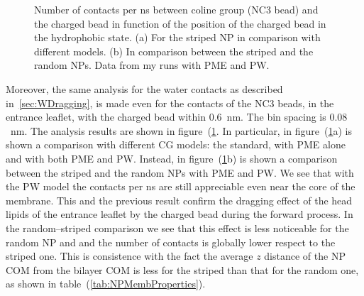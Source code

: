 \begin{figure}
	\center
	\caption{Number of contacts per ns between coline group (NC3 bead) and the charged bead in function of the position of the charged bead in the hydrophobic state. (a) For the striped \acs{NP} in comparison with different models. (b) In comparison between the striped and the random \acs{NP}s. Data from my runs with \acs{PME} and \acs{PW}.}
	\label{fig:NC3Contact}
\end{figure}

Moreover, the same analysis for the water contacts as described in~\ref{sec:WDragging}, is made even for the contacts of the NC$3$ beads, in the entrance leaflet, with the charged bead within $0.6$~nm. The bin spacing is $0.08$~nm. The analysis results are shown in figure~(\ref{fig:NC3Contact}. In particular, in figure~(\ref{fig:NC3Contact}a) is shown a comparison with different \ac{CG} \martini models: the standard, with \ac{PME} alone and with both \ac{PME} and \ac{PW}. Instead, in figure~(\ref{fig:NC3Contact}b) is shown a comparison between the striped and the random \acp{NP} with \ac{PME} and \ac{PW}. We see that with the \ac{PW} model the contacts per ns are still appreciable even near the core of the membrane. This and the previous result confirm the dragging effect of the head lipids of the entrance leaflet by the charged bead during the forward process. In the random--striped comparison we see that this effect is less noticeable for the random \ac{NP} and and the number of contacts is globally lower respect to the striped one. This is consistence with the fact the average $z$ distance of the \ac{NP} \ac{COM} from the bilayer \ac{COM} is less for the striped than that for the random one, as shown in table~(\ref{tab:NPMembProperties}).



